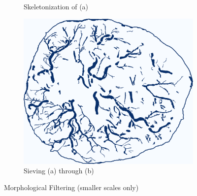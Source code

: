 \documentclass[9pt,notes]{beamer}
\begin{document}
\begin{frame}
\begin{figure}
\begin{subfigure}[b]{0.30\textwidth}
			\caption{Skeletonization of (a)}
		\end{subfigure}
		\begin{subfigure}[b]{0.30\textwidth}
			\includegraphics[width=\textwidth]{G-on_skel}
			\caption{Sieving (a) through (b)}
		\end{subfigure}
		\caption{Morphological Filtering (smaller scales only)}
	\end{figure}
\end{frame}
\end{document}
